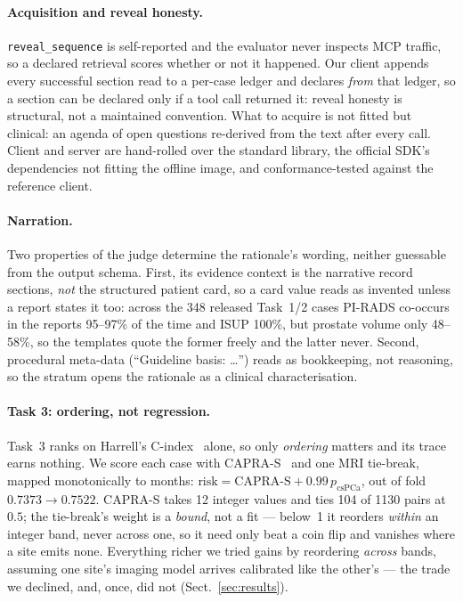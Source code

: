 \documentclass[runningheads]{llncs}
\newcommand{\code}[1]{\texttt{\small #1}}
\begin{document}
\paragraph{Acquisition and reveal honesty.}
\code{reveal\_sequence} is self-reported and the evaluator never inspects MCP traffic,
so a declared retrieval scores whether or not it happened. Our client appends every
successful section read to a per-case ledger and declares \emph{from} that ledger, so a
section can be declared only if a tool call returned it: reveal honesty is structural,
not a maintained convention. What to acquire is not fitted but clinical: an agenda of
open questions re-derived from the text after every call. Client and server are
hand-rolled over the standard library, the official SDK's
dependencies not fitting the offline image, and conformance-tested against the
reference client.

\paragraph{Narration.}
Two properties of the judge determine the rationale's wording, neither guessable from
the output schema. First, its evidence context is the narrative record sections,
\emph{not} the structured patient card, so a card value reads as invented unless a
report states it too: across the 348 released Task~1/2 cases PI-RADS co-occurs in the
reports 95--97\% of the time and ISUP 100\%, but prostate volume only 48--58\%, so the
templates quote the former freely and the latter never. Second, procedural meta-data
(``Guideline basis: \ldots'') reads as bookkeeping, not reasoning, so the stratum
opens the rationale as a clinical characterisation.

\paragraph{Task 3: ordering, not regression.}
Task~3 ranks on Harrell's C-index~\cite{harrell} alone, so only \emph{ordering}
matters and its trace earns nothing. We score each case with CAPRA-S~\cite{capras}
and one MRI tie-break, mapped monotonically to months: $\text{risk} =
\text{CAPRA-S} + 0.99\,p_{\text{csPCa}}$, out of fold $0.7373 \to 0.7522$. CAPRA-S
takes 12 integer values and ties 104 of 1130 pairs at $0.5$; the tie-break's weight is
a \emph{bound}, not a fit --- below~1 it reorders \emph{within} an integer band, never
across one, so it need only beat a coin flip and vanishes where a site emits none.
Everything richer we tried gains by reordering \emph{across}
bands, assuming one site's imaging model arrives calibrated like the other's --- the
trade we declined, and, once, did not (Sect.~\ref{sec:results}).
\end{document}
